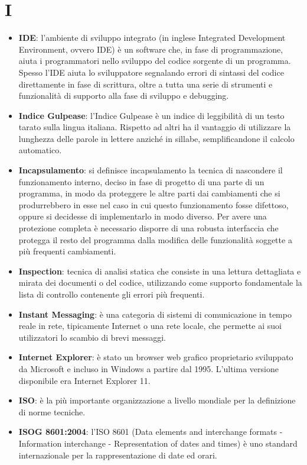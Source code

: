 \section{I}
\begin{itemize} 
	\item
	\textbf{IDE}: l’ambiente di sviluppo integrato (in inglese Integrated Development Environment, ovvero IDE) è un software che, in fase di programmazione, aiuta i programmatori nello sviluppo del codice sorgente di un programma. Spesso l’IDE aiuta lo sviluppatore segnalando errori di sintassi del codice direttamente in fase di scrittura, oltre a tutta una serie di strumenti e funzionalità di supporto alla fase di sviluppo e debugging.
	\item
	\textbf{Indice Gulpease}: l'Indice Gulpease è un indice di leggibilità di un testo tarato sulla lingua italiana. Rispetto ad altri ha il vantaggio di utilizzare la lunghezza delle parole in lettere anziché in sillabe, semplificandone il calcolo automatico.
	\item
	\textbf{Incapsulamento}: si definisce incapsulamento la tecnica di nascondere il funzionamento interno, deciso in fase di progetto di una parte di un programma, in modo da proteggere le altre parti dai cambiamenti che si produrrebbero in esse nel caso in cui questo funzionamento fosse difettoso, oppure si decidesse di implementarlo in modo diverso. Per avere una protezione completa è necessario disporre di una robusta interfaccia che protegga il resto del programma dalla modifica delle funzionalità soggette a più frequenti cambiamenti.
	\item
	\textbf{Inspection}: tecnica di analisi statica che consiste in una lettura dettagliata e mirata dei documenti o del codice, utilizzando come supporto fondamentale la lista di controllo contenente gli errori più frequenti.
	\item
	\textbf{Instant Messaging}: è una categoria di sistemi di comunicazione in tempo reale in rete, tipicamente Internet o una rete locale, che permette ai suoi utilizzatori lo scambio di brevi messaggi.
	\item
	\textbf{Internet Explorer}: è stato un browser web grafico proprietario sviluppato da Microsoft e incluso in Windows a partire dal 1995. L'ultima versione disponibile era Internet Explorer 11.
	\item
	\textbf{ISO}: è la più importante organizzazione a livello mondiale per la definizione di norme tecniche.
	\item
	\textbf{ISOG 8601:2004}: l'ISO 8601 (Data elements and interchange formats - Information interchange - Representation of dates and times) è uno standard internazionale per la rappresentazione di date ed orari.

\end{itemize}
